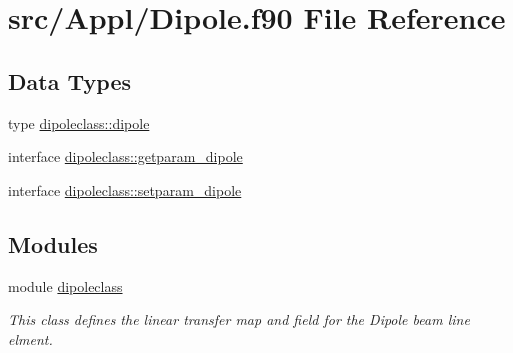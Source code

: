 \hypertarget{_dipole_8f90}{}\section{src/\+Appl/\+Dipole.f90 File Reference}
\label{_dipole_8f90}
\subsection*{Data Types}
\begin{DoxyCompactItemize}
\item 
type \mbox{\hyperlink{namespacedipoleclass_structdipoleclass_1_1dipole}{dipoleclass\+::dipole}}
\item 
interface \mbox{\hyperlink{interfacedipoleclass_1_1getparam__dipole}{dipoleclass\+::getparam\+\_\+dipole}}
\item 
interface \mbox{\hyperlink{interfacedipoleclass_1_1setparam__dipole}{dipoleclass\+::setparam\+\_\+dipole}}
\end{DoxyCompactItemize}
\subsection*{Modules}
\begin{DoxyCompactItemize}
\item 
module \mbox{\hyperlink{namespacedipoleclass}{dipoleclass}}
\begin{DoxyCompactList}\small\item\em This class defines the linear transfer map and field for the Dipole beam line elment. \end{DoxyCompactList}\end{DoxyCompactItemize}

